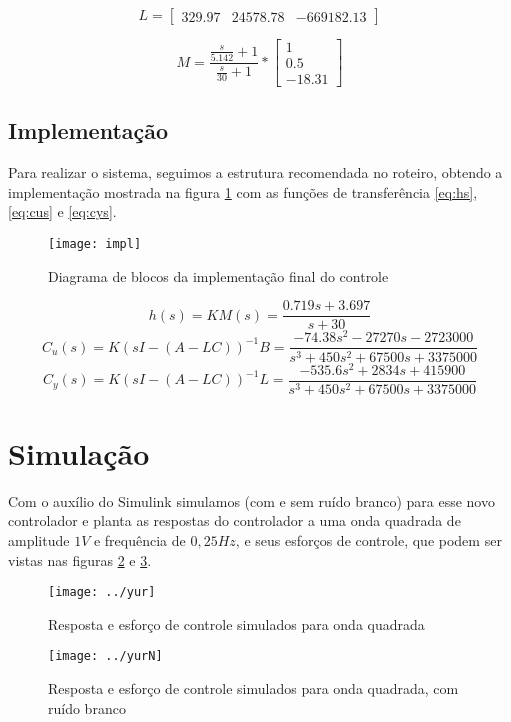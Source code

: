 \documentclass{article}
\begin{document}
\begin{equation}
\label{eq:matl}
L=
\begin{bmatrix}
329.97 & 24578.78 & -669182.13
\end{bmatrix}
\end{equation}

\begin{equation}
\label{eq:matm}
M = \frac{\frac{s}{5.142} + 1}{\frac{s}{30} + 1}*
\begin{bmatrix}
1\\
0.5\\
-18.31
\end{bmatrix}
\end{equation}

\subsection{Implementação}
Para realizar o sistema, seguimos a estrutura recomendada no roteiro\cite{bb:roteiro}, obtendo a implementação mostrada na figura \ref{fig:impl} com as funções de transferência \ref{eq:hs}, \ref{eq:cus} e \ref{eq:cys}.
\begin{figure}[H]
	\centering
	\texttt{[image: impl]}
	\caption{Diagrama de blocos da implementação final do controle}
	\label{fig:impl}
\end{figure}

\begin{equation}
\label{eq:hs}
h(s) = KM(s) = \frac{0.719 s + 3.697}{s+30}
\end{equation}
\begin{equation}
\label{eq:cus}
C_u(s) = K(sI - (A - LC))^{-1}B = \frac{-74.38 s^2 - 27270 s - 2723000}{s^3 + 450 s^2 + 67500 s + 3375000}
\end{equation}
\begin{equation}
\label{eq:cys}
C_y(s) = K(sI - (A - LC))^{-1}L = \frac{-535.6 s^2 + 2834 s + 415900}{s^3 + 450 s^2 + 67500 s + 3375000}
\end{equation}


\section{Simulação}
Com o auxílio do Simulink simulamos (com e sem ruído branco) para esse novo controlador e planta as respostas do controlador a uma onda quadrada de amplitude $1V$ e frequência de $0,25Hz$, e seus esforços de controle, que podem ser vistas nas figuras \ref{fig:yur} e \ref{fig:yurN}.
\begin{figure}[H]
	\centering
	\texttt{[image: ../yur]}
	\caption{Resposta e esforço de controle simulados para onda quadrada}
	\label{fig:yur}
\end{figure}
\begin{figure}[H]
	\centering
	\texttt{[image: ../yurN]}
	\caption{Resposta e esforço de controle simulados para onda quadrada, com ruído branco}
	\label{fig:yurN}
\end{figure}
\end{document}
